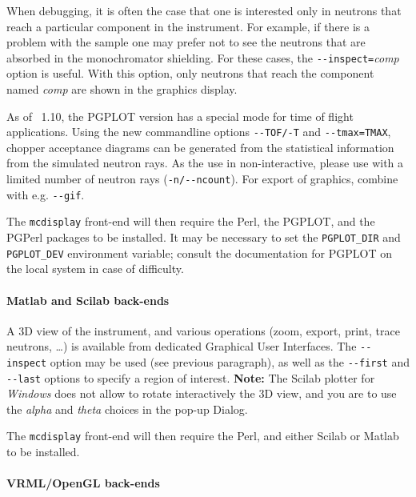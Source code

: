 When debugging, it is often the case that one is interested only in neutrons
that reach a particular component in the instrument. For example, if there is a
problem with the sample one may prefer not to see the neutrons that are absorbed
in the monochromator shielding. For these cases, the
\verb+--inspect=+\textit{comp\/} option is useful. With this option, only
neutrons that reach the component named \textit{comp\/} are shown in the
graphics display.

As of \MCS\ 1.10, the PGPLOT version has a special mode for time of flight
applications. Using the new commandline options \verb+--TOF/-T+ and
\verb+--tmax=TMAX+, chopper acceptance diagrams can be generated from the
statistical information from the simulated neutron rays. As the use in
non-interactive, please use with a limited number of neutron rays
(\verb+-n/--ncount+). For export of graphics, combine with e.g. \verb+--gif+.

 The \verb+mcdisplay+ front-end will then require the Perl,
the PGPLOT, and the PGPerl packages to be installed. It may be necessary to set
the \verb+PGPLOT_DIR+ and \verb+PGPLOT_DEV+ environment variable; consult the
documentation for PGPLOT on the local system in case of difficulty.
  

\paragraph{Matlab and Scilab back-ends}

A 3D view of the instrument, and various operations (zoom, export, print, trace
neutrons, \ldots) is available from dedicated Graphical User Interfaces.  The
\verb+--inspect+ option may be used (see previous paragraph), as well as the
\verb+--first+ and \verb+--last+ options to specify a region of interest. {\bf
  Note:} The Scilab plotter for \emph{Windows} does not allow to rotate
interactively the 3D view, and you are to use the \emph{alpha} and \emph{theta}
choices in the pop-up Dialog.

The \verb+mcdisplay+ front-end will then require the Perl, and either Scilab or
Matlab to be installed.  

\paragraph{VRML/OpenGL back-ends}

